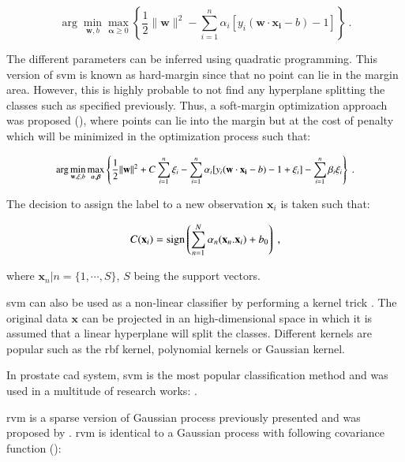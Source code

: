 \begin{enumerate}[leftmargin=*]
\begin{equation}
	\arg\min_{\mathbf{w},b } \max_{\boldsymbol{\alpha}\geq 0 } \left\{ \frac{1}{2}\|\mathbf{w}\|^2 - \sum_{i=1}^{n}{\alpha_i[y_i(\mathbf{w}\cdot \mathbf{x_i} - b)-1]} \right\} \ .
	\label{eq:svm2}
\end{equation}

The different parameters can be inferred using quadratic programming. This version of \ac{svm} is known as hard-margin since that no point can lie in the margin area. However, this is highly probable to not find any hyperplane splitting the classes such as specified previously. Thus, a soft-margin optimization approach was proposed (\cite{Cortes1995}), where points can lie into the margin but at the cost of penalty which will be minimized in the optimization process such that:

\begin{equation}
\small
\arg\min_{\mathbf{w},\mathbf{\xi}, b } \max_{\boldsymbol{\alpha},\boldsymbol{\beta} } \left\{ \frac{1}{2}\|\mathbf{w}\|^2+C \sum_{i=1}^n \xi_i - \sum_{i=1}^{n}{\alpha_i[y_i(\mathbf{w}\cdot \mathbf{x_i} - b) -1 + \xi_i]} - \sum_{i=1}^{n} \beta_i \xi_i \right\} \ .
\end{equation}

The decision to assign the label to a new observation $\mathbf{x}_i$ is taken such that:

\begin{equation}
	C(\mathbf{x}_i) = \operatorname*{sign} \left( \sum_{n=1}^{N} \alpha_n (\mathbf{x}_n . \mathbf{x}_i) + b_0 \right) \ ,
	\label{eq:svmdec} 
\end{equation}

\noindent where $\mathbf{x}_n|n=\{1,\cdots,S\}$, $S$ being the support vectors.

\ac{svm} can also be used as a non-linear classifier by performing a kernel trick \cite{Boser1992}. The original data $\mathbf{x}$ can be projected in an high-dimensional space in which it is assumed that a linear hyperplane will split the classes. Different kernels are popular such as the \ac{rbf} kernel, polynomial kernels or Gaussian kernel.

In prostate \ac{cad} system, \ac{svm} is the most popular classification method and was used in a multitude of research works: \cite{Artan2009,Artan2010,Chan2003,Kelm2007,Litjens2011,Litjens2012,Liu2013,Lopes2011,Niaf2011,Niaf2012,Ozer2009,Ozer2010,Parfait2012,Peng2013,Sung2011,Tiwari2012,Vos2008,Vos2008a,Vos2010,Vos2012}.

\Acf{rvm} is a sparse version of Gaussian process previously presented and was proposed by \cite{Tipping2001}. \ac{rvm} is identical to a Gaussian process with following covariance function (\cite{Quinonero-Candela2002}):


\end{enumerate}
